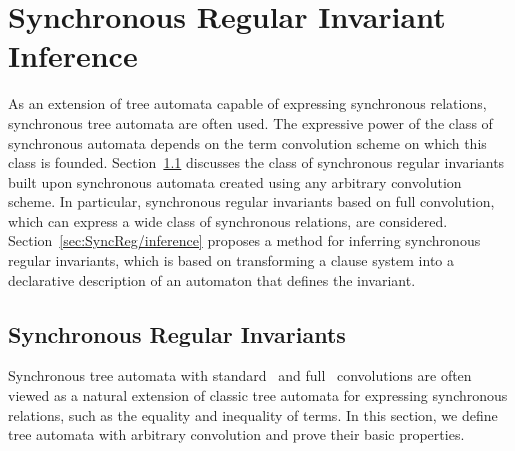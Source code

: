 \chapter{Synchronous Regular Invariant Inference}\label{ch:SyncReg}

As an extension of tree automata capable of expressing synchronous relations, synchronous tree automata are often used. The expressive power of the class of synchronous automata depends on the term convolution scheme on which this class is founded. Section~\cref{sec:SyncReg/syncAutomata} discusses the class of synchronous regular invariants built upon synchronous automata created using any arbitrary convolution scheme. In particular, synchronous regular invariants based on full convolution, which can express a wide class of synchronous relations, are considered. Section~\cref{sec:SyncReg/inference} proposes a method for inferring synchronous regular invariants, which is based on transforming a clause system into a declarative description of an automaton that defines the invariant.

\section{Synchronous Regular Invariants}\label{sec:SyncReg/syncAutomata}

Synchronous tree automata with standard~\cite{tata} and full~\cite{haude2020} convolutions are often viewed as a natural extension of classic tree automata for expressing synchronous relations, such as the equality and inequality of terms. In this section, we define tree automata with arbitrary convolution and prove their basic properties.

